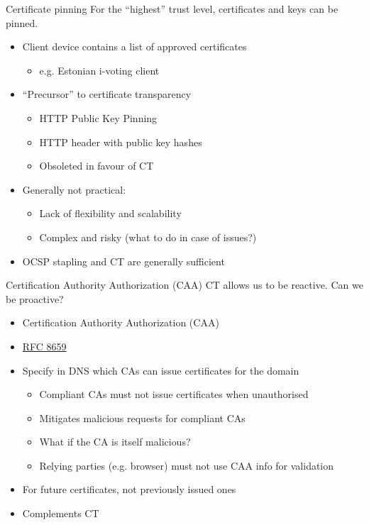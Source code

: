\begin{frame}{Certificate pinning}
  For the \enquote{highest} trust level, certificates and keys can be pinned.
  \begin{itemize}[<+(1)->]
    \item Client device contains a list of approved certificates
    \begin{itemize}
      \item e.g. Estonian i-voting client
    \end{itemize}
    \item \enquote{Precursor} to certificate transparency
    \begin{itemize}
      \item HTTP Public Key Pinning
      \item HTTP header with public key hashes
      \item Obsoleted in favour of CT
    \end{itemize}
    \item Generally not practical:
    \begin{itemize}
      \item Lack of flexibility and scalability
      \item Complex and risky (what to do in case of issues?)
    \end{itemize}
    \item OCSP stapling and CT are generally sufficient
  \end{itemize}
\end{frame}

\begin{frame}{Certification Authority Authorization (CAA)}
  CT allows us to be reactive.
  Can we be proactive?
  \begin{itemize}[<+(1)->]
    \item Certification Authority Authorization (CAA)
    \item \href{https://datatracker.ietf.org/doc/html/rfc8659}{RFC 8659}
    \item Specify in DNS which CAs can issue certificates for the domain
    \begin{itemize}
      \item Compliant CAs must not issue certificates when unauthorised
      \item Mitigates malicious requests for compliant CAs
      \item What if the CA is itself malicious?
      \item Relying parties (e.g. browser) must not use CAA info for validation
    \end{itemize}
    \item For future certificates, not previously issued ones
    \item Complements CT
  \end{itemize}
\end{frame}

